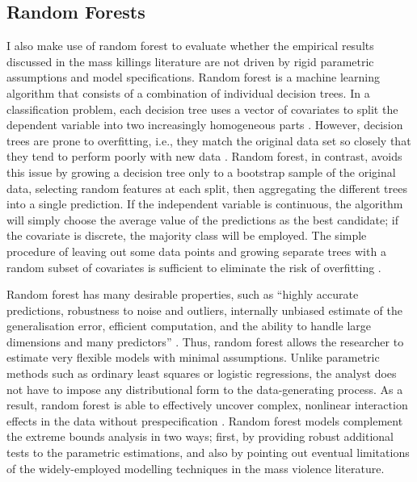 \documentclass[a4paper,12pt]{article}
\begin{document}
\subsection{Random Forests}
\label{sub:drf}

I also make use of random forest \citep{breiman2001random} to evaluate whether the empirical results discussed in the mass killings literature are not driven by rigid parametric assumptions and model specifications. Random forest is a machine learning algorithm that consists of a combination of individual decision trees. In a classification problem, each decision tree uses a vector of covariates to split the dependent variable into two increasingly homogeneous parts \citep{breiman2001statistical}. However, decision trees are prone to overfitting, i.e., they match the original data set so closely that they tend to perform poorly with new data \citep{dietterich1995comparison,ho1998random}. Random forest, in contrast, avoids this issue by growing a decision tree only to a bootstrap sample of the original data, selecting random features at each split, then aggregating the different trees into a single prediction. If the independent variable is continuous, the algorithm will simply choose the average value of the predictions as the best candidate; if the covariate is discrete, the majority class will be employed. The simple procedure of leaving out some data points and growing separate trees with a random subset of covariates is sufficient to eliminate the risk of overfitting \citep[9-10]{jones2015exploratory}.
	
Random forest has many desirable properties, such as ``highly accurate predictions, robustness to noise and outliers, internally unbiased estimate of the generalisation error, efficient computation, and the ability to handle large dimensions and many predictors'' \citep[7]{muchlinski2015comparing}. Thus, random forest allows the researcher to estimate very flexible models with minimal assumptions. Unlike parametric methods such as ordinary least squares or logistic regressions, the analyst does not have to impose any distributional form to the data-generating process. As a result, random forest is able to effectively uncover complex, nonlinear interaction effects in the data without prespecification \citep{jones2015exploratory,jones2018there}. Random forest models complement the extreme bounds analysis in two ways; first, by providing robust additional tests to the parametric estimations, and also by pointing out eventual limitations of the widely-employed modelling techniques in the mass violence literature. 
	
\end{document}
